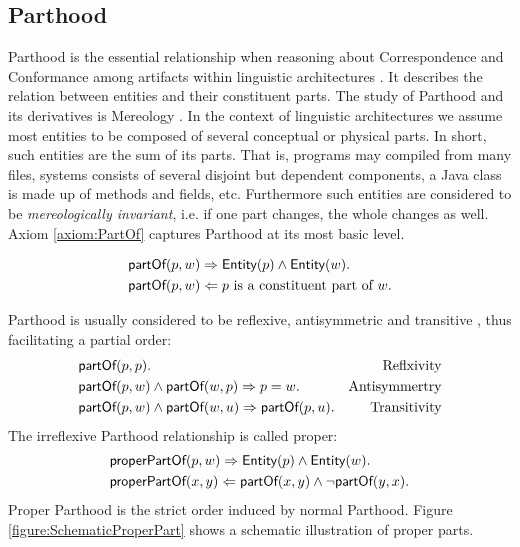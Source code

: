 \subsection{Parthood}
\label{subsection:Parthood}
\Gls{Parthood} is the essential relationship when reasoning about \gls{Correspondence} and \gls{Conformance} among artifacts within linguistic architectures \cite{DBLP:conf/sle/Lammel16} \cite{HeinzLV17}.
It describes the relation between entities and their constituent parts.
The study of \gls{Parthood} and its derivatives is \gls{Mereology} \cite{DBLP:journals/dke/Varzi96} \cite{SEP:Mereology}.
In the context of linguistic architectures we assume most entities to be
composed of several conceptual or physical parts.
In short, such entities are the sum of its parts.
That is, programs may compiled from many files, systems consists of several disjoint but dependent components, a \gls{Java} class is made up of methods and fields, etc.
Furthermore such entities are considered to be \textit{mereologically invariant}, i.e. if one part changes, the whole changes as well. 
Axiom \ref{axiom:PartOf} captures \gls{Parthood} at its most basic level.
\begin{axiom}[\partOf]
\label{axiom:PartOf}
\begin{align*}
&\textsf{partOf}(p,w)
\Rightarrow
\textsf{Entity}(p) \wedge \textsf{Entity}(w).\\
&\textsf{partOf}(p,w)
\Leftarrow
p \text{ is a constituent part of } w.
\end{align*}
\end{axiom}
\Gls{Parthood} is usually considered to be reflexive, antisymmetric and transitive \cite{DBLP:journals/dke/Varzi96} \cite{SEP:Mereology}, thus facilitating a partial order:
\begin{align*}
&\textsf{partOf}(p,p). &\text{Reflxivity}\\
&\textsf{partOf}(p,w) \wedge \textsf{partOf}(w,p)
\Rightarrow
p = w. &\text{Antisymmertry}\\
&\textsf{partOf}(p,w) \wedge \textsf{partOf}(w,u)
\Rightarrow 
\textsf{partOf}(p,u). &\text{Transitivity}
\end{align*}
The irreflexive \gls{Parthood} relationship is called proper:
\begin{align*}
&\textsf{properPartOf}(p,w)
\Rightarrow
\textsf{Entity}(p) \wedge \textsf{Entity}(w).\\
&\textsf{properPartOf}(x,y)
\Leftarrow
\textsf{partOf}(x,y) \wedge \neg \textsf{partOf}(y,x).
\end{align*}
Proper \gls{Parthood} is the strict order induced by normal \gls{Parthood}.
Figure \ref{figure:SchematicProperPart} shows a schematic illustration of proper parts.
